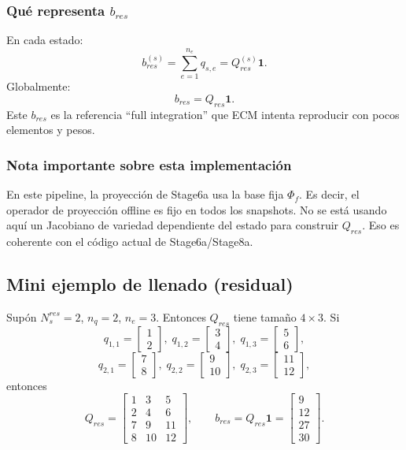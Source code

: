 \documentclass[11pt,a4paper]{article}
\begin{document}
\subsubsection*{Qué representa $b_{res}$}
En cada estado:
\[
b_{res}^{(s)}=\sum_{e=1}^{n_e} q_{s,e}=Q_{res}^{(s)}\mathbf{1}.
\]
Globalmente:
\[
b_{res}=Q_{res}\mathbf{1}.
\]
Este $b_{res}$ es la referencia ``full integration'' que ECM intenta reproducir con pocos elementos y pesos.

\subsubsection*{Nota importante sobre esta implementación}
En este pipeline, la proyección de Stage6a usa la base fija $\Phi_f$.
Es decir, el operador de proyección offline es fijo en todos los snapshots.
No se está usando aquí un Jacobiano de variedad dependiente del estado para construir $Q_{res}$.
Eso es coherente con el código actual de Stage6a/Stage8a.

\subsection{Mini ejemplo de llenado (residual)}
Supón $N_s^{res}=2$, $n_q=2$, $n_e=3$.
Entonces $Q_{res}$ tiene tamaño $4\times3$.
Si
\[
q_{1,1}=\begin{bmatrix}1\\2\end{bmatrix},\;
q_{1,2}=\begin{bmatrix}3\\4\end{bmatrix},\;
q_{1,3}=\begin{bmatrix}5\\6\end{bmatrix},
\]
\[
q_{2,1}=\begin{bmatrix}7\\8\end{bmatrix},\;
q_{2,2}=\begin{bmatrix}9\\10\end{bmatrix},\;
q_{2,3}=\begin{bmatrix}11\\12\end{bmatrix},
\]
entonces
\[
Q_{res}=
\begin{bmatrix}
1&3&5\\
2&4&6\\
7&9&11\\
8&10&12
\end{bmatrix},
\qquad
b_{res}=Q_{res}\mathbf{1}=
\begin{bmatrix}
9\\12\\27\\30
\end{bmatrix}.
\]
\end{document}

